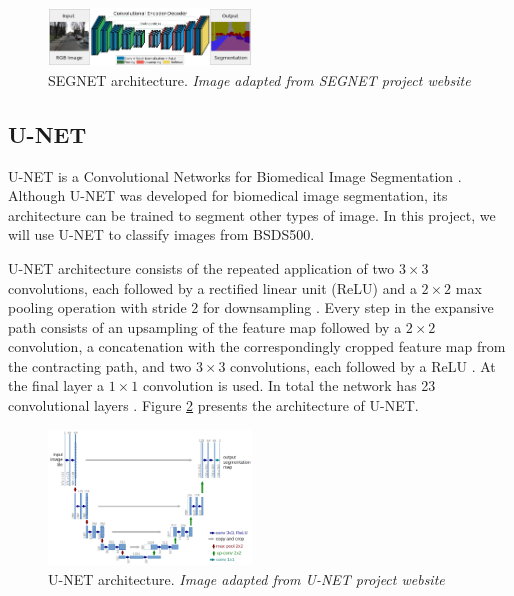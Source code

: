 \documentclass[10pt,twocolumn,letterpaper]{article}
\begin{document}
\begin{figure}[ht]
  \centering
  \includegraphics[width=0.48\textwidth]{segnet.png}
  \caption{SEGNET architecture. \textit{Image adapted from SEGNET project website} \cite{SEGNET_WEBSITE} \cite{SEGNET}}
  \label{fig:segnet}
\end{figure}

\subsection{U-NET} \label{ssec:unet}

U-NET is a Convolutional Networks for Biomedical Image Segmentation \cite{UNET} \cite{UNET_WEBSITE}. Although U-NET was developed for biomedical image segmentation, its architecture can be trained to segment other types of image. In this project, we will use U-NET to classify images from BSDS500.

U-NET architecture consists of the repeated application of two $3 \times 3$ convolutions, each followed by a rectified linear unit (ReLU) and a $2 \times 2$ max pooling operation with stride 2 for downsampling \cite{UNET}. Every step in the expansive path consists of an upsampling of the feature map followed by a $2 \times 2$ convolution, a concatenation with the correspondingly cropped feature map from the contracting path, and two $3 \times 3$ convolutions, each followed by a ReLU \cite{UNET}. At the final layer a $1 \times 1$ convolution is used. In total the network has 23 convolutional layers \cite{UNET}. Figure \ref{fig:unet} presents the  architecture of U-NET.

\begin{figure}[ht]
  \centering
  \includegraphics[width=0.48\textwidth]{unet.png}
  \caption{U-NET architecture. \textit{Image adapted from U-NET project website} \cite{UNET_WEBSITE} \cite{UNET}}
  \label{fig:unet}
\end{figure}
\end{document}
